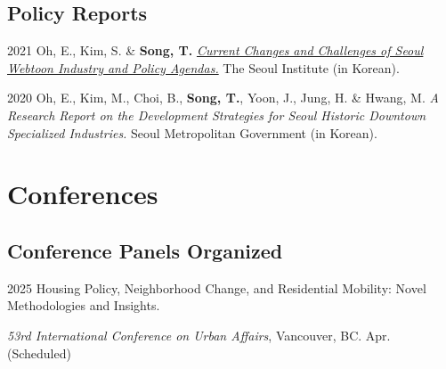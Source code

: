 \documentclass[12pt,letterpaper]{report}
\newcommand{\listitemspace}{0.4em}
\renewenvironment{itemize}
{\begin{list}{}{\setlength{\leftmargin}{0.5em}
                \setlength{\parskip}{0em}
                \setlength{\itemsep}{\listitemspace}
                \setlength{\parsep}{\listitemspace}}}
{\end{list}}
\begin{document}
    \subsection*{Policy Reports}
    \begin{tablist}
        \item[2021] \tab{}Oh, E., Kim, S. \& \textbf{Song, T.} \emph{\href{http://global.si.re.kr/content/current-changes-and-challenges-seoul-webtoon-industry-and-policy-agendas}{Current Changes and Challenges of Seoul Webtoon Industry and Policy Agendas.}} The Seoul Institute (in Korean).
        \item[2020] \tab{}Oh, E., Kim, M., Choi, B., \textbf{Song, T.}, Yoon, J., Jung, H. \& Hwang, M. \emph{A Research Report on the Development Strategies for Seoul Historic Downtown Specialized Industries.} Seoul Metropolitan Government (in Korean).
    \end{tablist}
    
    \section*{Conferences}
\subsection*{Conference Panels Organized}
  \begin{tablist}
    \item[2025] \tab{}Housing Policy, Neighborhood Change, and Residential Mobility: Novel Methodologies and Insights. 
    \begin{itemize}
      \item \emph{53rd International Conference on Urban Affairs}, Vancouver, BC. Apr. (Scheduled)
    \end{itemize}
  \end{tablist}
\end{document}
